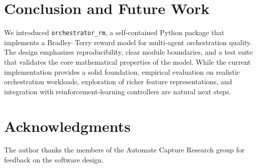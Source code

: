 \documentclass[11pt,a4paper]{article}
\begin{document}
\section{Conclusion and Future Work}
We introduced \texttt{orchestrator\_rm}, a self‑contained Python package that implements a Bradley–Terry reward model for multi‑agent orchestration quality.  The design emphasizes reproducibility, clear module boundaries, and a test suite that validates the core mathematical properties of the model.  While the current implementation provides a solid foundation, empirical evaluation on realistic orchestration workloads, exploration of richer feature representations, and integration with reinforcement‑learning controllers are natural next steps.

\section*{Acknowledgments}
The author thanks the members of the Automate Capture Research group for feedback on the software design.



\end{document}
